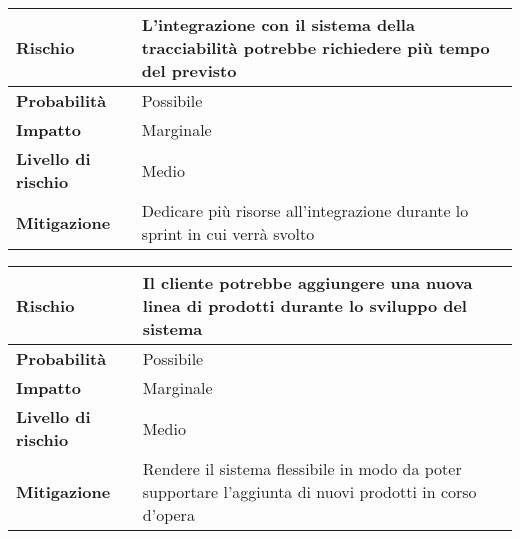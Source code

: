 \begin{table}[H]
  \begin{tabularx}{\textwidth}{lX}
    \toprule
    \textbf{Rischio}            & \textbf{L'integrazione con il sistema della tracciabilità potrebbe richiedere più tempo del previsto} \\
    \midrule
    \textbf{Probabilità}        & Possibile                                                                                             \\
    \textbf{Impatto}            & Marginale                                                                                             \\
    \textbf{Livello di rischio} & Medio                                                                                                 \\
    \textbf{Mitigazione}        & Dedicare più risorse all'integrazione durante lo sprint in cui verrà svolto                           \\
    \bottomrule
  \end{tabularx}
\end{table}

\begin{table}[H]
  \begin{tabularx}{\textwidth}{lX}
    \toprule
    \textbf{Rischio}            & \textbf{Il cliente potrebbe aggiungere una nuova linea di prodotti durante lo sviluppo del sistema}     \\
    \midrule
    \textbf{Probabilità}        & Possibile                                                                                               \\
    \textbf{Impatto}            & Marginale                                                                                               \\
    \textbf{Livello di rischio} & Medio                                                                                                   \\
    \textbf{Mitigazione}        & Rendere il sistema flessibile in modo da poter supportare l'aggiunta di nuovi prodotti in corso d'opera \\
    \bottomrule
  \end{tabularx}
\end{table}

